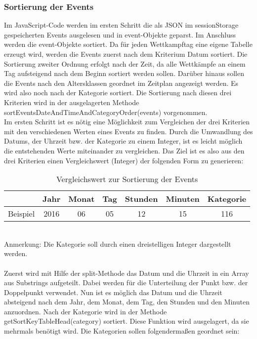 \subsubsection{Sortierung der Events}
Im JavaScript-Code werden im ersten Schritt die als JSON im sessionStorage gespeicherten Events ausgelesen und in event-Objekte geparst. Im Anschluss werden die event-Objekte sortiert. Da für jeden Wettkampftag eine eigene Tabelle erzeugt wird, werden die Events zuerst nach dem Kriterium Datum sortiert. Die Sortierung zweiter Ordnung erfolgt nach der Zeit, da alle Wettkämpfe an einem Tag aufsteigend nach dem Beginn sortiert werden sollen. Darüber hinaus sollen die Events nach den Altersklassen geordnet im Zeitplan angezeigt werden. Es wird also noch nach der Kategorie sortiert. Die Sortierung nach diesen drei Kriterien wird in der ausgelagerten Methode sortEventsDateAndTimeAndCategoryOrder(events) vorgenommen.\\
Im ersten Schritt ist es nötig eine Möglichkeit zum Vergleichen der drei Kriterien mit den verschiedenen Werten eines Events zu finden. Durch die Umwandlung des Datums, der Uhrzeit bzw. der Kategorie zu einem Integer, ist es leicht möglich die entstehenden Werte miteinander zu vergleichen. Das Ziel ist es also aus den drei Kriterien einen Vergleichswert (Integer) der folgenden Form zu generieren: 
\begin{table}[h]
\caption{Vergleichswert zur Sortierung der Events}
\begin{tabular}{|l||c|c|c|c|c|c|}
\hline
 & Jahr & Monat & Tag & Stunden & Minuten & Kategorie \\
\hline
Beispiel & 2016 & 06 & 05 & 12 & 15 & 116 \\
\hline
\end{tabular}
\label{tab: Vergleichswert zur Sortierung der Events}
\end{table} \\
Anmerkung: Die Kategorie soll durch einen dreistelligen Integer dargestellt werden.\\
\\
Zuerst wird mit Hilfe der split-Methode das Datum und die Uhrzeit in ein Array aus Substrings aufgeteilt. Dabei werden für die Unterteilung der Punkt bzw. der Doppelpunkt verwendet. Nun ist es möglich das Datum und die Uhrzeit absteigend nach dem Jahr, dem Monat, dem Tag, den Stunden und den Minuten anzuordnen. 
Nach der Kategorie wird in der Methode getSortKeyTableHead(category) sortiert. Diese Funktion wird ausgelagert, da sie mehrmals benötigt wird. Die Kategorien sollen folgendermaßen geordnet sein: \\
